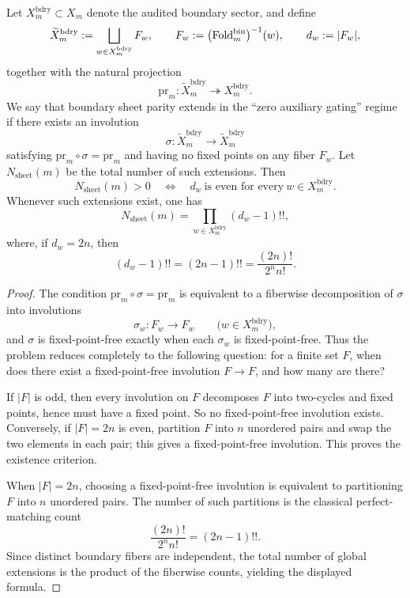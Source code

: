 \begin{theorem}\label{thm:window6-bdry-sheet-parity-nonfunctorial-extension}
Let \(X_m^{\mathrm{bdry}}\subset X_m\) denote the audited boundary sector, and define
\[
\widetilde X_m^{\mathrm{bdry}}
:=
\bigsqcup_{w\in X_m^{\mathrm{bdry}}}F_w,
\qquad
F_w:=
\bigl(\operatorname{Fold}^{\mathrm{bin}}_m\bigr)^{-1}(w),
\qquad
d_w:=|F_w|,
\]
together with the natural projection
\[
\mathrm{pr}_m:\widetilde X_m^{\mathrm{bdry}}\twoheadrightarrow X_m^{\mathrm{bdry}}.
\]
We say that boundary sheet parity extends in the ``zero auxiliary gating'' regime if there exists an involution
\[
\sigma:\widetilde X_m^{\mathrm{bdry}}\longrightarrow \widetilde X_m^{\mathrm{bdry}}
\]
satisfying \(\mathrm{pr}_m\circ \sigma=\mathrm{pr}_m\) and having no fixed points on any fiber \(F_w\).
Let \(N_{\mathrm{sheet}}(m)\) be the total number of such extensions.
Then
\[
N_{\mathrm{sheet}}(m)>0
\quad\Longleftrightarrow\quad
d_w\ \text{is even for every}\ w\in X_m^{\mathrm{bdry}}.
\]
Whenever such extensions exist, one has
\[
N_{\mathrm{sheet}}(m)
=
\prod_{w\in X_m^{\mathrm{bdry}}}(d_w-1)!!,
\]
where, if \(d_w=2n\), then
\[
(d_w-1)!!=(2n-1)!!=\frac{(2n)!}{2^n n!}.
\]
\end{theorem}

\begin{proof}
The condition \(\mathrm{pr}_m\circ \sigma=\mathrm{pr}_m\) is equivalent to a fiberwise decomposition of \(\sigma\) into involutions
\[
\sigma_w:F_w\to F_w
\qquad
\bigl(w\in X_m^{\mathrm{bdry}}\bigr),
\]
and \(\sigma\) is fixed-point-free exactly when each \(\sigma_w\) is fixed-point-free.
Thus the problem reduces completely to the following question: for a finite set \(F\), when does there exist a fixed-point-free involution \(F\to F\), and how many are there?
\par
If \(|F|\) is odd, then every involution on \(F\) decomposes \(F\) into two-cycles and fixed points, hence must have a fixed point.
So no fixed-point-free involution exists.
Conversely, if \(|F|=2n\) is even, partition \(F\) into \(n\) unordered pairs and swap the two elements in each pair; this gives a fixed-point-free involution.
This proves the existence criterion.
\par
When \(|F|=2n\), choosing a fixed-point-free involution is equivalent to partitioning \(F\) into \(n\) unordered pairs.
The number of such partitions is the classical perfect-matching count
\[
\frac{(2n)!}{2^n n!}=(2n-1)!!.
\]
Since distinct boundary fibers are independent, the total number of global extensions is the product of the fiberwise counts, yielding the displayed formula. \qedhere
\end{proof}

